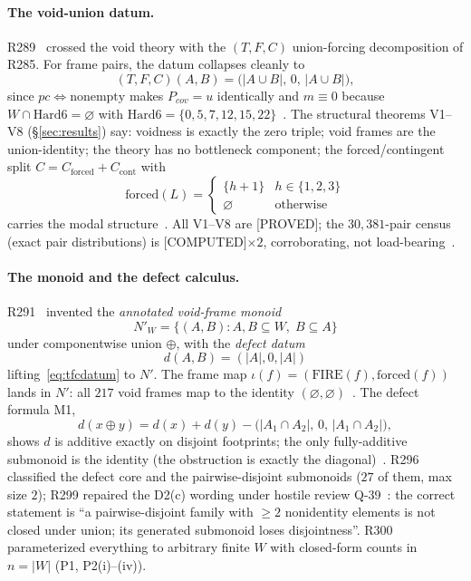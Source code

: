 \documentclass[11pt,a4paper]{article}
\theoremstyle{definition}
\begin{document}
\paragraph{The void-union datum.} R289~\cite{D289} crossed the void theory
with the $(T,F,C)$ union-forcing decomposition of R285. For frame pairs,
the datum collapses cleanly to
\begin{equation}
  \label{eq:tfcdatum}
  (T,F,C)(A,B)=\bigl(|A\cup B|,\,0,\,|A\cup B|\bigr),
\end{equation}
since $pc\iff\text{nonempty}$ makes $P_{cov}=u$ identically and
$m\equiv0$ because $W\cap\mathrm{Hard6}=\varnothing$ with
$\mathrm{Hard6}=\{0,5,7,12,15,22\}$~\cite{D289}. The structural theorems
V1--V8 (§\ref{sec:results}) say: voidness is exactly the zero triple;
void frames are the union-identity; the theory has no bottleneck
component; the forced/contingent split
$C=C_{\mathrm{forced}}+C_{\mathrm{cont}}$ with
\begin{equation}
  \label{eq:forced}
  \mathrm{forced}(L)=
  \begin{cases}\{h+1\}&h\in\{1,2,3\}\\ \varnothing&\text{otherwise}\end{cases}
\end{equation}
carries the modal structure~\cite{D289}. All V1--V8 are [PROVED]; the
$30{,}381$-pair census (exact pair distributions) is
[COMPUTED]$\times2$, corroborating, not load-bearing~\cite{D289}.

\paragraph{The monoid and the defect calculus.} R291~\cite{D291} invented
the \emph{annotated void-frame monoid}
\begin{equation}
  \label{eq:nprime}
  N'_W=\{(A,B):A,B\subseteq W,\;B\subseteq A\}
\end{equation}
under componentwise union $\oplus$, with the \emph{defect datum}
\begin{equation}
  \label{eq:defect}
  d(A,B)=(|A|,0,|A|)
\end{equation}
lifting~\eqref{eq:tfcdatum} to $N'$. The frame map
$\iota(f)=(\mathrm{FIRE}(f),\mathrm{forced}(f))$ lands in $N'$: all $217$
void frames map to the identity $(\varnothing,\varnothing)$~\cite{D291}.
The defect formula M1,
\begin{equation}
  \label{eq:defectop}
  d(x\oplus y)=d(x)+d(y)-\bigl(|A_1\cap A_2|,\,0,\,|A_1\cap A_2|\bigr),
\end{equation}
shows $d$ is additive exactly on disjoint footprints; the only
fully-additive submonoid is the identity (the obstruction is exactly the
diagonal)~\cite{D291}. R296~\cite{D296} classified the defect core and
the pairwise-disjoint submonoids ($27$ of them, max size $2$); R299
repaired the D2(c) wording under hostile review
Q-39~\cite{D299}: the correct statement is ``a pairwise-disjoint family
with $\ge2$ nonidentity elements is not closed under union; its
generated submonoid loses disjointness''. R300~\cite{D300} parameterized
everything to arbitrary finite $W$ with closed-form counts in
$n=|W|$ (P1, P2(i)--(iv)).
\end{document}
